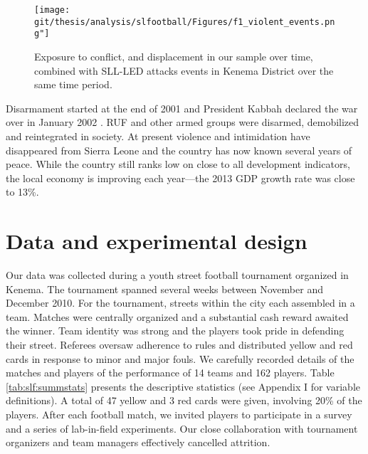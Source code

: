 \begin{figure}[htb]
  \texttt{[image: \\git/thesis/analysis/slfootball/Figures/f1\_violent\_events.png"]}
  \caption{Exposure to conflict, and displacement in our sample over time, combined with SLL-LED attacks events in Kenema District over the same time period.}
  \label{fig:slf:conflictexposure}
\end{figure}

Disarmament started at the end of 2001 and President Kabbah declared the war over in January 2002 \cite{Peters2011}. RUF and other armed groups were disarmed, demobilized and reintegrated in society. At present violence and intimidation have disappeared from Sierra Leone and the country has now known several years of peace. While the country still ranks low on close to all development indicators, the local economy is improving each year––the 2013 GDP growth rate was close to 13\%.

\section{Data and experimental design}
\label{sec:slf:data}
Our data was collected during a youth street football tournament organized in Kenema. The tournament spanned several weeks between November and December 2010. For the tournament, streets within the city each assembled in a team. Matches were centrally organized and a substantial cash reward awaited the winner. Team identity was strong and the players took pride in defending their street. Referees oversaw adherence to rules and distributed yellow and red cards in response to minor and major fouls.  We carefully recorded details of the matches and players of the performance of 14 teams and 162 players.  Table \ref{tab:slf:summstats} presents the descriptive statistics (see Appendix I for variable definitions). A total of 47 yellow and 3 red cards were given, involving 20\% of the players. After each football match, we invited players to participate in a survey and a series of lab-in-field experiments. Our close collaboration with tournament organizers and team managers effectively cancelled attrition. 

